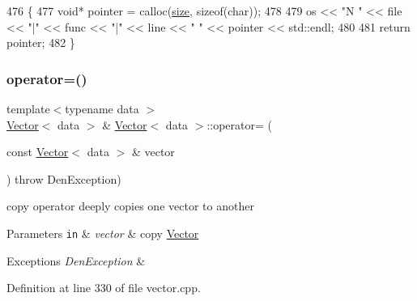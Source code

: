 \begin{DoxyCode}
476     \{
477         \textcolor{keywordtype}{void}* pointer = calloc(\hyperlink{classVector_a81b1d973485244101caf8e901b4a03d9}{size}, \textcolor{keyword}{sizeof}(\textcolor{keywordtype}{char}));
478 
479         os << \textcolor{stringliteral}{"N "} << file << \textcolor{stringliteral}{"|"} << func << \textcolor{stringliteral}{"|"} << line << \textcolor{stringliteral}{" "} << pointer << std::endl;
480 
481         \textcolor{keywordflow}{return} pointer;
482     \}
\end{DoxyCode}
\mbox{\label{classVector_adbc0fdf77e48a52048cb1a4bfc2393cc}} 
\subsubsection{\texorpdfstring{operator=()}{operator=()}\hspace{0.1cm}{\footnotesize\ttfamily [1/2]}}
{\footnotesize\ttfamily template$<$typename data $>$ \\
\hyperlink{classVector}{Vector}$<$ data $>$ \& \hyperlink{classVector}{Vector}$<$ data $>$\+::operator= (\begin{DoxyParamCaption}\item[{const \hyperlink{classVector}{Vector}$<$ data $>$ \&}]{vector }\end{DoxyParamCaption}) throw  Den\+Exception) }



copy operator  deeply copies one vector to another 


\begin{DoxyParams}[1]{Parameters}
\mbox{\tt in}  & {\em vector} & copy \hyperlink{classVector}{Vector} \\
\hline
\end{DoxyParams}

\begin{DoxyExceptions}{Exceptions}
{\em Den\+Exception} & \\
\hline
\end{DoxyExceptions}


Definition at line 330 of file vector.\+cpp.



